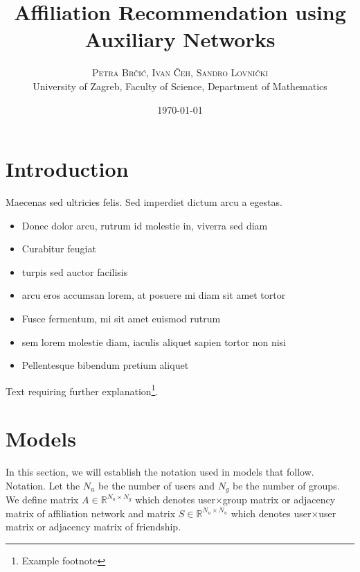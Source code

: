 \documentclass[twoside,twocolumn]{article}
\title{Affiliation Recommendation using Auxiliary Networks} %
\author{%
\textsc{Petra Brčić, Ivan Čeh, Sandro Lovnički}\\[1ex]%
\normalsize University of Zagreb, Faculty of Science, Department of Mathematics \\ %
}
\date{\today} %
\begin{document}
\maketitle


\section{Introduction}

\blindtext %

Maecenas sed ultricies felis. Sed imperdiet dictum arcu a egestas. 
\begin{itemize}
\item Donec dolor arcu, rutrum id molestie in, viverra sed diam
\item Curabitur feugiat
\item turpis sed auctor facilisis
\item arcu eros accumsan lorem, at posuere mi diam sit amet tortor
\item Fusce fermentum, mi sit amet euismod rutrum
\item sem lorem molestie diam, iaculis aliquet sapien tortor non nisi
\item Pellentesque bibendum pretium aliquet
\end{itemize}
\blindtext %

Text requiring further explanation\footnote{Example footnote}.


\section{Models}
In this section, we will establish the notation used in models that follow. \\
Notation. Let the $N_u$ be the number of users and $N_g$ be the number of groups. We define matrix $A \in \mathbb{R}^{N_u \times N_g}$ which denotes user$\times$group matrix or adjacency matrix of affiliation network and matrix $S \in \mathbb{R}^{N_u \times N_u}$ which denotes user$\times$user matrix or adjacency matrix of friendship. \\
\end{document}
